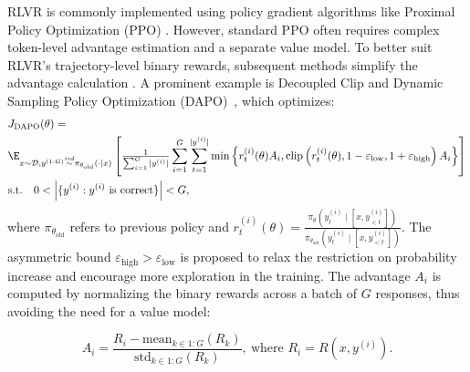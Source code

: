 RLVR is commonly implemented using policy gradient algorithms like Proximal Policy Optimization (PPO) \citep{schulman2017proximal}. However, standard PPO often requires complex token-level advantage estimation and a separate value model. To better suit RLVR's trajectory-level binary rewards, subsequent methods simplify the advantage calculation \citep{shao2024deepseekmath,yu2025dapo}. A prominent example is Decoupled Clip and Dynamic Sampling Policy Optimization (DAPO)~\citep{yu2025dapo}, which optimizes:
{
\begin{align*}
&J_{\text{DAPO}}(\theta)=\\ 
&\E_{x \sim \mathcal{D},y^{(1:G)} \overset{iid}{\sim} \pi_{\theta_{\text{old}}}(\cdot\mid x)} 
\left[\tfrac{1}{\sum_{i=1}^G |y^{(i)}|}\sum_{i=1}^G\sum_{t=1}^{|y^{(i)}|}\min\left\{r^{(i)}_{t}(\theta)A_i,\mathrm{clip}\left(r^{(i)}_{t}(\theta),1-\varepsilon_{\text{low}},1+\varepsilon_{\text{high}}\right)A_i\right\}
\right]\\
&\mathrm{s.t.}\quad 0<\left|\{y^{(i)}:y^{(i)}\mathrm{~is~correct}\}\right|<G,
\end{align*}
}where $\pi_{\theta_{\text{old}}}$ refers to previous policy and $r^{(i)}_{t}(\theta)=\frac{\pi_{\theta}(y^{(i)}_{t} \mid [x, y^{(i)}_{<t}])}{\pi_{\theta_{\text{old}}}(y^{(i)}_{t} \mid [x, y^{(i)}_{<t}])}$.  The asymmetric bound $\varepsilon_{\text{high}} > \varepsilon_{\text{low}}$ is proposed to relax the restriction on probability increase and encourage more exploration in the training. 
The advantage $A_i$ is computed by normalizing the binary rewards across a batch of $G$ responses, thus avoiding the need for a value model:
\begin{small}
\begin{equation*}
A_i=\frac{R_i-\mathrm{mean}_{k\in 1:G}(R_k)}{\mathrm{std}_{k\in 1:G}(R_k)},~
\text{where } R_i=R(x,y^{(i)}).
\end{equation*}
\end{small}
%

